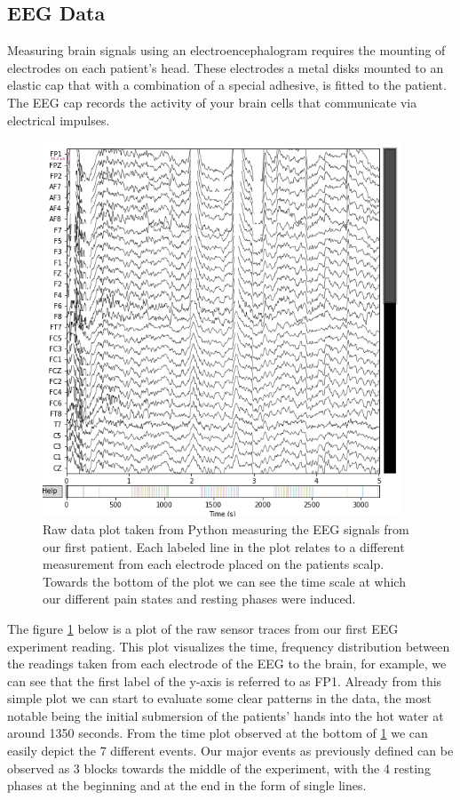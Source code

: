 \documentclass[12pt]{article}
\begin{document}
\subsection{EEG Data}
Measuring brain signals using an electroencephalogram requires the mounting of electrodes on each patient’s head. These electrodes a metal disks mounted to an elastic cap that with a combination of a special adhesive, is fitted to the patient. The EEG cap records the activity of your brain cells that communicate via electrical impulses.

\begin{figure}[tb]
\centering
\includegraphics[width=0.95\textwidth]{RawPlot.png}
\caption{\label{fig:RawPlot}Raw data plot taken from Python measuring the EEG signals from our first patient. Each labeled line in the plot relates to a different measurement from each electrode placed on the patients scalp. Towards the bottom of the plot we can see the time scale at which our different pain states and resting phases were induced. }
\end{figure} 

The figure \ref{fig:RawPlot} below is a plot of the raw sensor traces from our first EEG experiment reading. This plot visualizes the time, frequency distribution between the readings taken from each electrode of the EEG to the brain, for example, we can see that the first label of the y-axis is referred to as FP1. Already from this simple plot we can start to evaluate some clear patterns in the data, the most notable being the initial submersion of the patients’ hands into the hot water at around 1350 seconds. From the time plot observed at the bottom of \ref{fig:RawPlot} we can easily depict the 7 different events. Our major events as previously defined can be observed as 3 blocks towards the middle of the experiment, with the 4 resting phases at the beginning and at the end in the form of single lines.
\end{document}
